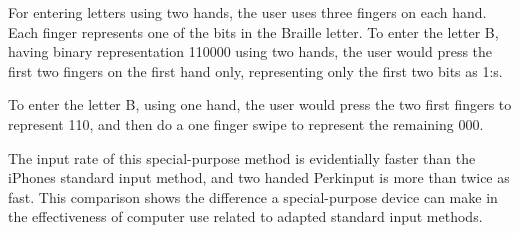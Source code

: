 For entering letters using two hands, the user uses three fingers on each hand. Each finger represents one of the bits in the Braille letter. To enter the letter B, having binary representation 110000 using two hands, the user would press the first two fingers on the first hand only, representing only the first two bits as 1:s.

To enter the letter B, using one hand, the user would press the two first fingers to represent 110, and then do a one finger swipe to represent the remaining 000.

The input rate of this special-purpose method is evidentially faster than the iPhones standard input method\cite{azenkot}, and two handed Perkinput is more than twice as fast. This comparison shows the difference a special-purpose device can make in the effectiveness of computer use related to adapted standard input methods. 

